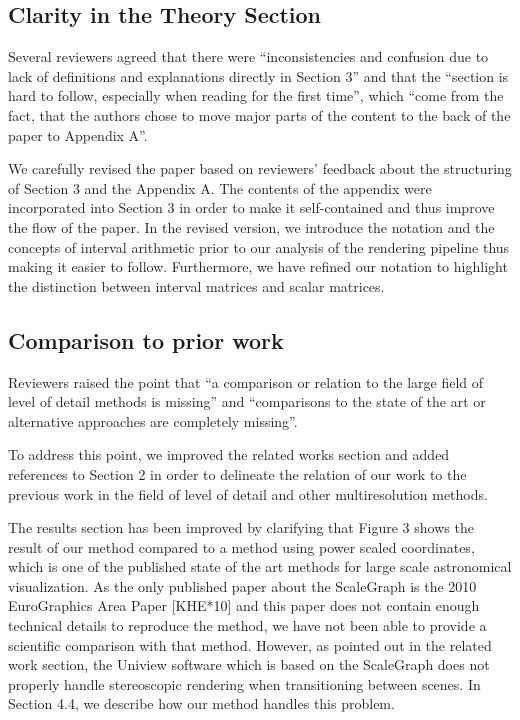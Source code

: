 \documentclass{article}
\begin{document}
\begin{tcolorbox}
\subsection{Clarity in the Theory Section}\label{concern:structure}
Several reviewers agreed that there were ``inconsistencies and confusion due to lack of definitions and explanations directly in Section 3'' and that the ``section is hard to follow, especially when reading for the first time'', which ``come from the fact, that the authors chose to move major parts of the content to the back of the paper to Appendix A''.
\end{tcolorbox}
We carefully revised the paper based on reviewers' feedback about the structuring of Section 3 and the Appendix A.
The contents of the appendix were incorporated into Section 3 in order to make it self-contained and thus improve the flow of the paper.
In the revised version, we introduce the notation and the concepts of interval arithmetic prior to our analysis of the rendering pipeline thus making it easier to follow.
Furthermore, we have refined our notation to highlight the distinction between interval matrices and scalar matrices.

\vspace*{1cm}


\begin{tcolorbox}
\subsection{Comparison to prior work}\label{concern:comparisons}
Reviewers raised the point that ``a comparison or relation to the large field of level of detail methods is missing'' and ``comparisons to the state of the art or alternative approaches are completely missing''.
\end{tcolorbox}
To address this point, we improved the related works section and added references to Section 2 in order to delineate the relation of our work to the previous work in the field of level of detail and other multiresolution methods.

The results section has been improved by clarifying that Figure 3 shows the result of our method compared to a method using power scaled coordinates, which is one of the published state of the art methods for large scale astronomical visualization.
As the only published paper about the ScaleGraph is the 2010 EuroGraphics Area Paper [KHE*10] and this paper does not contain enough technical details to reproduce the method, we have not been able to provide a scientific comparison with that method.
However, as pointed out in the related work section, the Uniview software which is based on the ScaleGraph does not properly handle stereoscopic rendering when transitioning between scenes.
In Section 4.4, we describe how our method handles this problem.
\end{document}
